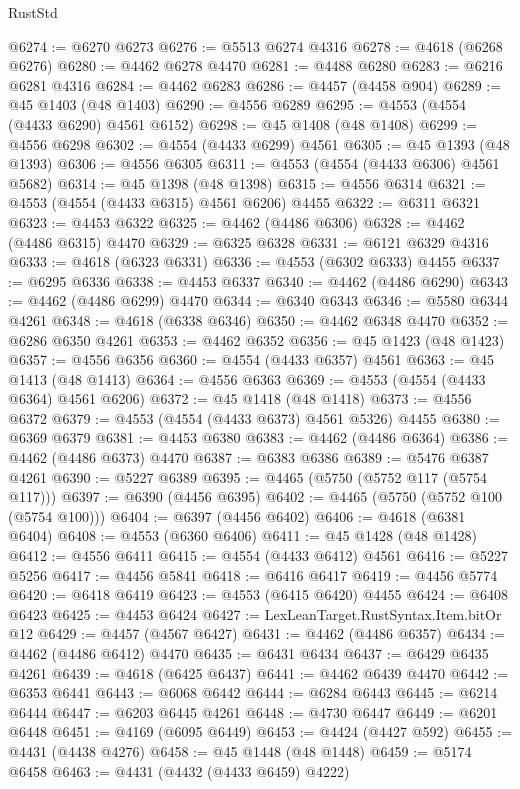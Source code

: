 \begin{lexlean}{RustStd}
\begin{coremodule}
@6274 := @6270 @6273
@6276 := @5513 @6274 @4316
@6278 := @4618 (@6268 @6276)
@6280 := @4462 @6278 @4470
@6281 := @4488 @6280
@6283 := @6216 @6281 @4316
@6284 := @4462 @6283
@6286 := @4457 (@4458 @904)
@6289 := @45 @1403 (@48 @1403)
@6290 := @4556 @6289
@6295 := @4553 (@4554 (@4433 @6290) @4561 @6152)
@6298 := @45 @1408 (@48 @1408)
@6299 := @4556 @6298
@6302 := @4554 (@4433 @6299) @4561
@6305 := @45 @1393 (@48 @1393)
@6306 := @4556 @6305
@6311 := @4553 (@4554 (@4433 @6306) @4561 @5682)
@6314 := @45 @1398 (@48 @1398)
@6315 := @4556 @6314
@6321 := @4553 (@4554 (@4433 @6315) @4561 @6206) @4455
@6322 := @6311 @6321
@6323 := @4453 @6322
@6325 := @4462 (@4486 @6306)
@6328 := @4462 (@4486 @6315) @4470
@6329 := @6325 @6328
@6331 := @6121 @6329 @4316
@6333 := @4618 (@6323 @6331)
@6336 := @4553 (@6302 @6333) @4455
@6337 := @6295 @6336
@6338 := @4453 @6337
@6340 := @4462 (@4486 @6290)
@6343 := @4462 (@4486 @6299) @4470
@6344 := @6340 @6343
@6346 := @5580 @6344 @4261
@6348 := @4618 (@6338 @6346)
@6350 := @4462 @6348 @4470
@6352 := @6286 @6350 @4261
@6353 := @4462 @6352
@6356 := @45 @1423 (@48 @1423)
@6357 := @4556 @6356
@6360 := @4554 (@4433 @6357) @4561
@6363 := @45 @1413 (@48 @1413)
@6364 := @4556 @6363
@6369 := @4553 (@4554 (@4433 @6364) @4561 @6206)
@6372 := @45 @1418 (@48 @1418)
@6373 := @4556 @6372
@6379 := @4553 (@4554 (@4433 @6373) @4561 @5326) @4455
@6380 := @6369 @6379
@6381 := @4453 @6380
@6383 := @4462 (@4486 @6364)
@6386 := @4462 (@4486 @6373) @4470
@6387 := @6383 @6386
@6389 := @5476 @6387 @4261
@6390 := @5227 @6389
@6395 := @4465 (@5750 (@5752 @117 (@5754 @117)))
@6397 := @6390 (@4456 @6395)
@6402 := @4465 (@5750 (@5752 @100 (@5754 @100)))
@6404 := @6397 (@4456 @6402)
@6406 := @4618 (@6381 @6404)
@6408 := @4553 (@6360 @6406)
@6411 := @45 @1428 (@48 @1428)
@6412 := @4556 @6411
@6415 := @4554 (@4433 @6412) @4561
@6416 := @5227 @5256
@6417 := @4456 @5841
@6418 := @6416 @6417
@6419 := @4456 @5774
@6420 := @6418 @6419
@6423 := @4553 (@6415 @6420) @4455
@6424 := @6408 @6423
@6425 := @4453 @6424
@6427 := LexLeanTarget.RustSyntax.Item.bitOr @12
@6429 := @4457 (@4567 @6427)
@6431 := @4462 (@4486 @6357)
@6434 := @4462 (@4486 @6412) @4470
@6435 := @6431 @6434
@6437 := @6429 @6435 @4261
@6439 := @4618 (@6425 @6437)
@6441 := @4462 @6439 @4470
@6442 := @6353 @6441
@6443 := @6068 @6442
@6444 := @6284 @6443
@6445 := @6214 @6444
@6447 := @6203 @6445 @4261
@6448 := @4730 @6447
@6449 := @6201 @6448
@6451 := @4169 (@6095 @6449)
@6453 := @4424 (@4427 @592)
@6455 := @4431 (@4438 @4276)
@6458 := @45 @1448 (@48 @1448)
@6459 := @5174 @6458
@6463 := @4431 (@4432 (@4433 @6459) @4222)

\end{coremodule}
\end{lexlean}
